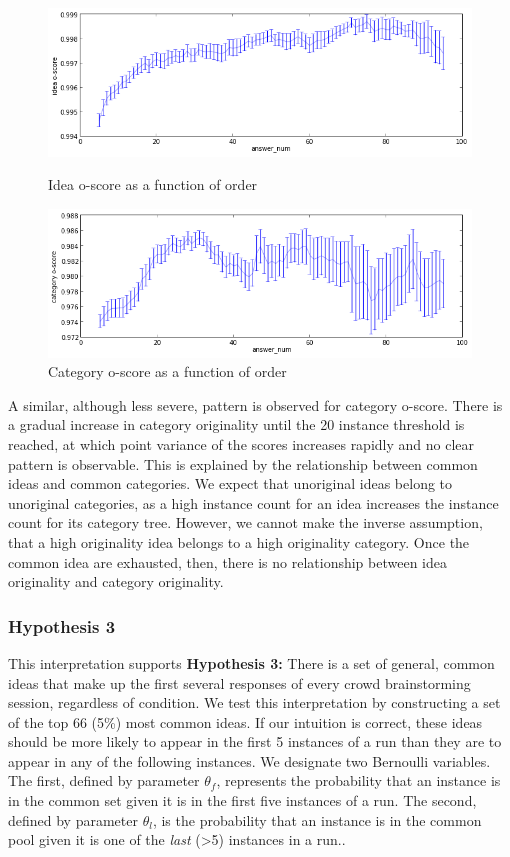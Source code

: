 \begin{figure}[h]
    \centering
    \includegraphics[width=0.9\columnwidth]{idea_oscore_order}
    \caption{Idea o-score as a function of order}
    \includegraphics[width=0.9\columnwidth]{cat_oscore_order}
    \caption{Category o-score as a function of order}
\end{figure}

A similar, although less severe, pattern is observed for category o-score. There is a gradual increase in category originality until the 20 instance threshold is reached, at which point variance of the scores increases rapidly and no clear pattern is observable. This is explained by the relationship between common ideas and common categories. We expect that unoriginal ideas belong to unoriginal categories, as a high instance count for an idea increases the instance count for its category tree. However, we cannot make the inverse assumption, that a high originality idea belongs to a high originality category. Once the common idea are exhausted, then, there is no relationship between idea originality and category originality.

\subsubsection{Hypothesis 3}

This interpretation supports \textbf{Hypothesis 3:} There is a set of general, common ideas that make up the first several responses of every crowd brainstorming session, regardless of condition. We test this interpretation by constructing a set of the top 66 (5\%) most common ideas. If our intuition is correct, these ideas should be more likely to appear in the first 5 instances of a run than they are to appear in any of the following instances. We designate two Bernoulli variables. The first, defined by parameter $\theta_f$, represents the probability that an instance is in the common set given it is in the first five instances of a run. The second, defined by parameter $\theta_l$, is the probability that an instance is in the common pool given it is one of the \emph{last} (>5) instances in a run..

